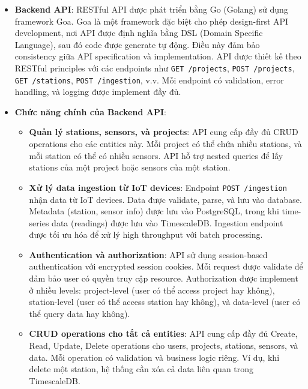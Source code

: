 \begin{itemize}
    \item \textbf{Backend API}: RESTful API được phát triển bằng Go (Golang) sử dụng framework Goa. Goa là một framework đặc biệt cho phép design-first API development, nơi API được định nghĩa bằng DSL (Domain Specific Language), sau đó code được generate tự động. Điều này đảm bảo consistency giữa API specification và implementation. API được thiết kế theo RESTful principles với các endpoints như \texttt{GET /projects}, \texttt{POST /projects}, \texttt{GET /stations}, \texttt{POST /ingestion}, v.v. Mỗi endpoint có validation, error handling, và logging được implement đầy đủ.
    
    \item \textbf{Chức năng chính của Backend API}:
        \begin{itemize}
            \item \textbf{Quản lý stations, sensors, và projects}: API cung cấp đầy đủ CRUD operations cho các entities này. Mỗi project có thể chứa nhiều stations, và mỗi station có thể có nhiều sensors. API hỗ trợ nested queries để lấy stations của một project hoặc sensors của một station.
            
            \item \textbf{Xử lý data ingestion từ IoT devices}: Endpoint \texttt{POST /ingestion} nhận data từ IoT devices. Data được validate, parse, và lưu vào database. Metadata (station, sensor info) được lưu vào PostgreSQL, trong khi time-series data (readings) được lưu vào TimescaleDB. Ingestion endpoint được tối ưu hóa để xử lý high throughput với batch processing.
            
            \item \textbf{Authentication và authorization}: API sử dụng session-based authentication với encrypted session cookies. Mỗi request được validate để đảm bảo user có quyền truy cập resource. Authorization được implement ở nhiều levels: project-level (user có thể access project hay không), station-level (user có thể access station hay không), và data-level (user có thể query data hay không).
            
            \item \textbf{CRUD operations cho tất cả entities}: API cung cấp đầy đủ Create, Read, Update, Delete operations cho users, projects, stations, sensors, và data. Mỗi operation có validation và business logic riêng. Ví dụ, khi delete một station, hệ thống cần xóa cả data liên quan trong TimescaleDB.
            

\end{itemize}
\end{itemize}
